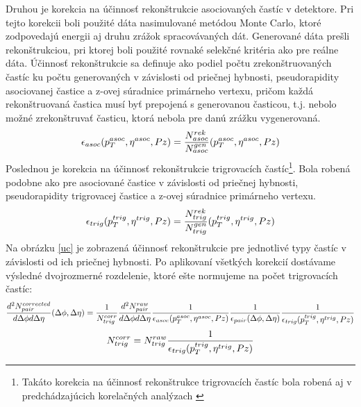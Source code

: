 \documentclass[thesismargins, thesislinespacing]{rnthesis}
\begin{document}
Druhou je korekcia na účinnosť rekonštrukcie asociovaných častíc v detektore. Pri tejto korekcii boli použité dáta nasimulované metódou Monte Carlo, ktoré zodpovedajú energii aj druhu zrážok spracovávaných dát. Generované dáta prešli re\-kon\-štruk\-ciou, pri ktorej boli použité rovnaké selekčné kritéria ako pre reálne dáta. Účinnosť re\-kon\-štruk\-cie sa definuje ako podiel počtu zrekonštruovaných častíc ku počtu generovaných v závislosti od priečnej hybnosti, pseudorapidity asociovanej častice a z-ovej súradnice primárneho vertexu, pričom každá rekonštruovaná častica musí byť prepojená s generovanou časticou, t.j. nebolo možné zrekonštruvať časticu, ktorá nebola pre danú zrážku vygenerovaná.  
\begin{equation}
\footnotesize
\epsilon_{asoc}(p_{T}^{asoc},\eta^{asoc},Pz) = \frac{N_{asoc}^{rek}}{N_{asoc}^{gen}}(p_{T}^{asoc},\eta^{asoc},Pz)
\end{equation}
Poslednou je korekcia na účinnosť rekonštrukcie trigrovacích častíc\footnote{Takáto korekcia na účinnosť rekonštrukce trigrovacích častíc bola robená aj v predchádzajúcich korelačných analýzach \cite{Jan-Fiete}}. Bola robená podobne ako pre asociované častice v závislosti od priečnej hybnosti, pseudorapidity trigrovacej častice a z-ovej súradnice primárneho vertexu. 
\begin{equation}
\footnotesize
\epsilon_{trig}(p_{T}^{trig},\eta^{trig},Pz) = \frac{N_{trig}^{rek}}{N_{trig}^{gen}}(p_{T}^{trig},\eta^{trig},Pz)
\end{equation}
\begin{equation}\end{equation}
Na obrázku \ref{uc} je zobrazená účinnosť rekonštrukcie pre jednotlivé typy častíc v závislosti od ich priečnej hybnosti. Po aplikovaní všetkých korekcií dostávame výsledné dvojrozmerné rozdelenie, ktoré ešte normujeme na počet trigrovacích častíc:
\begin{equation}
\footnotesize
\frac{d^2N^{corrected}_{pair}}{d\Delta\phi d\Delta\eta}(\Delta\phi,\Delta \eta)=
\frac{1}{N^{corr}_{trig}} \frac{d^2N^{raw}_{pair}}{d\Delta\phi d\Delta\eta} \frac{1}{\epsilon_{asoc}(p_{T}^{asoc},\eta^{asoc},Pz)}\frac{1}{\epsilon_{pair}(\Delta\phi,\Delta\eta)}
\frac{1}{\epsilon_{trig}(p_{T}^{trig},\eta^{trig},Pz)}
\end{equation}
\begin{equation}
\footnotesize
N^{corr}_{trig}=N^{raw}_{trig}\frac{1}{\epsilon_{trig}(p_{T}^{trig},\eta^{trig},Pz)}
\end{equation}
\end{document}
